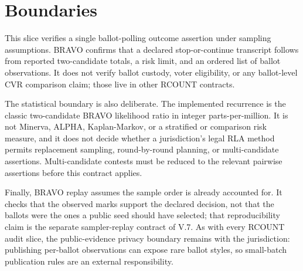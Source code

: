 \section{Boundaries}

This slice verifies a single ballot-polling outcome assertion under sampling
assumptions. BRAVO confirms that a declared stop-or-continue transcript follows
from reported two-candidate totals, a risk limit, and an ordered list of ballot
observations. It does not verify ballot custody, voter eligibility, or any
ballot-level CVR comparison claim; those live in other RCOUNT contracts.

The statistical boundary is also deliberate. The implemented recurrence is the
classic two-candidate BRAVO likelihood ratio in integer parts-per-million. It is
not Minerva, ALPHA, Kaplan-Markov, or a stratified or comparison risk measure,
and it does not decide whether a jurisdiction's legal RLA method permits
replacement sampling, round-by-round planning, or multi-candidate assertions.
Multi-candidate contests must be reduced to the relevant pairwise assertions
before this contract applies.

Finally, BRAVO replay assumes the sample order is already accounted for. It
checks that the observed marks support the declared decision, not that the
ballots were the ones a public seed should have selected; that reproducibility
claim is the separate sampler-replay contract of V.7. As with every RCOUNT audit
slice, the public-evidence privacy boundary remains with the jurisdiction:
publishing per-ballot observations can expose rare ballot styles, so small-batch
publication rules are an external responsibility.
